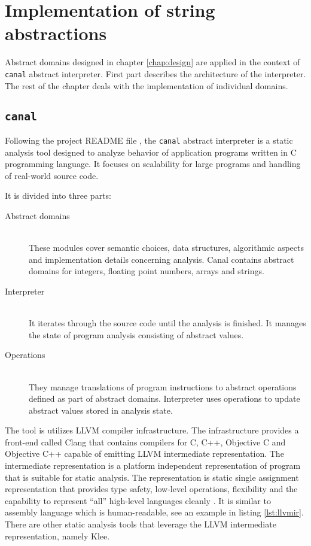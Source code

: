 \documentclass[12pt,final,oneside]{fithesis2}
\theoremstyle{definition}
\begin{document}
\chapter{Implementation of string abstractions}
\label{chap:implementation}

Abstract domains designed in chapter \ref{chap:design} are applied in the
context of \texttt{canal} abstract interpreter. First part describes the
architecture of the interpreter. The rest of the chapter deals with the
implementation of individual domains.


\section{\texttt{canal}}

Following the project README file \cite{Klic12-1}, the \texttt{canal}
abstract interpreter is a static analysis tool designed to analyze behavior
of application programs written in C programming language. It focuses
on scalability for large programs and handling of real-world source code.

It is divided into three parts:

\begin{description}

\item[Abstract domains] \hfill \\
These modules cover semantic choices, data
structures, algorithmic aspects and implementation details concerning
analysis. Canal contains abstract domains for integers, floating point
numbers, arrays and strings.

\item[Interpreter] \hfill \\
It iterates through the source code until the analysis
is finished. It manages the state of program analysis consisting of
abstract values.

\item[Operations] \hfill \\
They manage translations of program instructions to
abstract operations defined as part of abstract domains. Interpreter uses
operations to update abstract values stored in analysis state.

\end{description}

The tool is utilizes LLVM compiler infrastructure. The infrastructure
provides a front-end called Clang that contains compilers for C, C++,
Objective C and Objective C++ capable of emitting LLVM intermediate
representation. The intermediate representation is a platform independent
representation of program that is suitable for static analysis.
The representation is static single assignment representation that provides
type safety, low-level operations, flexibility and the capability to
represent ``all'' high-level languages cleanly \cite{llvm13-1}. It is similar
to assembly language which is human-readable, see an example in
listing \ref{lst:llvmir}. There are other static analysis tools that leverage
the LLVM intermediate representation, namely Klee.
\end{document}

